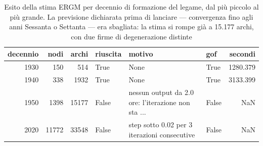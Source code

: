 \begin{table}
\centering
\caption{Esito della stima ERGM per decennio di formazione del legame, dal più piccolo al più grande. La previsione dichiarata prima di lanciare — convergenza fino agli anni Sessanta o Settanta — era sbagliata: la stima si rompe già a 15.177 archi, con due firme di degenerazione distinte}
\label{tab:t4_ergm_decenni_esiti}
\begin{tabular}{rrrlllr}
\toprule
 decennio &  nodi &  archi &  riuscita &                                             motivo &   gof &  secondi \\
\midrule
     1930 &   150 &    514 &      True &                                               None &  True & 1280.379 \\
     1940 &   338 &   1932 &      True &                                               None &  True & 3133.399 \\
     1950 &  1398 &  15177 &     False & nessun output da 2.0 ore: l'iterazione non sta ... & False &      NaN \\
     2020 & 11772 &  33548 &     False &       step sotto 0.02 per 3 iterazioni consecutive & False &      NaN \\
\bottomrule
\end{tabular}
\end{table}
